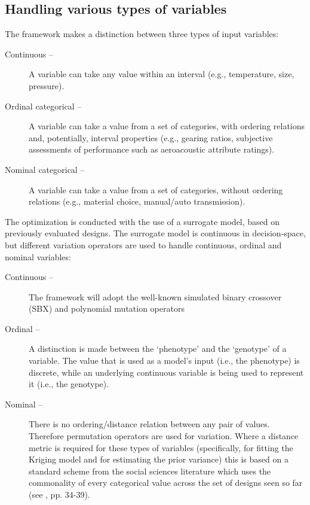 \documentclass[a4paper]{article}
\begin{document}
\subsection{Handling various types of variables}
\label{subsec:Types of Variables}
The framework makes a distinction between three types of input variables:
\begin{description}
	\item[Continuous --] A variable can take any value within an interval (e.g., temperature, size, pressure).
	\item[Ordinal categorical --] A variable can take a value from a set of categories, with ordering relations and, potentially, interval properties (e.g., gearing ratios, subjective assessments of performance such as aeroacoustic attribute ratings).
	\item[Nominal categorical --] A variable can take a value from a set of categories, without ordering relations (e.g., material choice, manual/auto transmission).
\end{description}
The optimization is conducted with the use of a surrogate model, based on previously evaluated designs.
The surrogate model is continuous in decision-space, but different variation operators are used to handle continuous, ordinal and nominal variables:
\begin{description}
	\item[Continuous --] The framework will adopt the well-known simulated binary crossover (SBX) and polynomial mutation operators~\cite{Deb1995Simulated}
	\item[Ordinal --] A distinction is made between the `phenotype' and the `genotype' of a variable. The value that is used as a model's input (i.e., the phenotype) is discrete, while an underlying continuous variable is being used to represent it (i.e., the genotype).
	\item[Nominal --] There is no ordering/distance relation between any pair of values. Therefore permutation operators are used for variation. Where a distance metric is required for these types of variables (specifically, for fitting the Kriging model and for estimating the prior variance) this is based on a standard scheme from the social sciences literature which uses the commonality of every categorical value across the set of designs seen so far (see \cite{LeRoux2010Multiple}, pp. 34-39).
\end{description}
\end{document}
